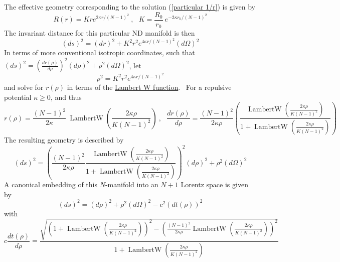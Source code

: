 \documentclass{article}%
\begin{document}
The effective geometry corresponding to the solution (\ref{particular 1/r}) is
given by%
\begin{equation}
R\left(  r\right)  =Kre^{2\kappa r/\left(  N-1\right)  ^{2}}\ ,\ \ \ K=\frac
{R_{0}}{r_{0}}~e^{-2\kappa r_{0}/\left(  N-1\right)  ^{2}}%
\end{equation}
The invariant distance for this particular ND manifold is then%
\begin{equation}
\left(  ds\right)  ^{2}=\left(  dr\right)  ^{2}+K^{2}r^{2}e^{4\kappa r/\left(
N-1\right)  ^{2}}\left(  d\Omega\right)  ^{2}%
\end{equation}
In terms of more conventional isotropic coordinates, such that $\left(
ds\right)  ^{2}=\left(  \frac{dr\left(  \rho\right)  }{d\rho}\right)
^{2}\left(  d\rho\right)  ^{2}+\rho^{2}\left(  d\Omega\right)  ^{2}$, let%
\begin{equation}
\rho^{2}=K^{2}r^{2}e^{4\kappa r/\left(  N-1\right)  ^{2}}%
\end{equation}
and solve for $r\left(  \rho\right)  $ in terms of the
\href{https://en.wikipedia.org/wiki/Lambert_W_function}{Lambert W function}.
\ For a repulsive potential $\kappa\geq0$, and thus%
\begin{equation}
r\left(  \rho\right)  =\frac{\left(  N-1\right)  ^{2}}{2\kappa}%
~\operatorname{LambertW}\left(  \frac{2\kappa\rho}{K\left(  N-1\right)  ^{2}%
}\right)  \ ,\ \ \ \frac{dr\left(  \rho\right)  }{d\rho}=\frac{\left(
N-1\right)  ^{2}}{2\kappa\rho}\left(  \frac{\operatorname{LambertW}\left(
\frac{2\kappa\rho}{K\left(  N-1\right)  ^{2}}\right)  }%
{1+\operatorname{LambertW}\left(  \frac{2\kappa\rho}{K\left(  N-1\right)
^{2}}\right)  }\right)
\end{equation}
The resulting geometry is described by%
\begin{equation}
\left(  ds\right)  ^{2}=\left(  \frac{\left(  N-1\right)  ^{2}}{2\kappa\rho
}\frac{\operatorname{LambertW}\left(  \frac{2\kappa\rho}{K\left(  N-1\right)
^{2}}\right)  }{1+\operatorname{LambertW}\left(  \frac{2\kappa\rho}{K\left(
N-1\right)  ^{2}}\right)  }\right)  ^{2}\left(  d\rho\right)  ^{2}+\rho
^{2}\left(  d\Omega\right)  ^{2}%
\end{equation}
A canonical embedding of this $N$-manifold into an $N+1$ Lorentz space is
given by%
\begin{equation}
\left(  ds\right)  ^{2}=\left(  d\rho\right)  ^{2}+\rho^{2}\left(
d\Omega\right)  ^{2}-c^{2}\left(  dt\left(  \rho\right)  \right)  ^{2}%
\end{equation}
with%
\begin{equation}
c\frac{dt\left(  \rho\right)  }{d\rho}=\frac{\sqrt{\left(
1+\operatorname{LambertW}\left(  \frac{2\kappa\rho}{K\left(  N-1\right)  ^{2}%
}\right)  \right)  ^{2}-\left(  \frac{\left(  N-1\right)  ^{2}}{2\kappa\rho
}\operatorname{LambertW}\left(  \frac{2\kappa\rho}{K\left(  N-1\right)  ^{2}%
}\right)  \right)  ^{2}}}{1+\operatorname{LambertW}\left(  \frac{2\kappa\rho
}{K\left(  N-1\right)  ^{2}}\right)  } \label{TimeEmbedding}%
\end{equation}
\end{document}
